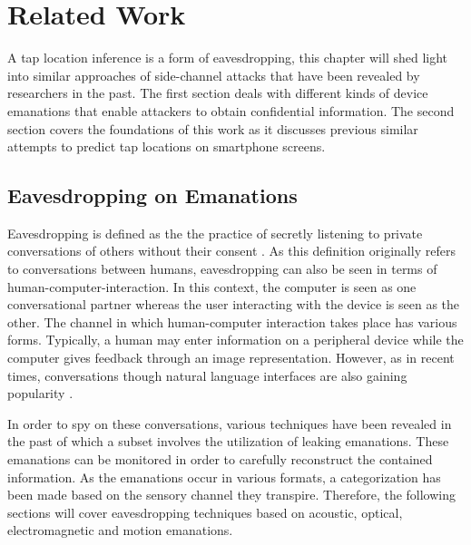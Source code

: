 \chapter{Related Work\label{cha:chapter2}}
A tap location inference is a form of eavesdropping, this chapter will shed light into similar approaches of side-channel attacks that have been revealed by researchers in the past. The first section deals with different kinds of device emanations that enable attackers to obtain confidential information. The second section covers the foundations of this work as it discusses previous similar attempts to predict tap locations on smartphone screens.

\section{Eavesdropping on Emanations}

Eavesdropping is defined as the the practice of secretly listening to private conversations of others without their consent \cite{black1990black}. As this definition originally refers to conversations between humans, eavesdropping can also be seen in terms of human-computer-interaction. In this context, the computer is seen as one conversational partner whereas the user interacting with the device is seen as the other. The channel in which human-computer interaction takes place has various forms. Typically, a human may enter information on a peripheral device while the computer gives feedback through an image representation. However, as in recent times, conversations though natural language interfaces are also gaining popularity \cite{shneiderman2016designing}.

In order to spy on these conversations, various techniques have been revealed in the past of which a subset involves the utilization of leaking emanations. These emanations can be monitored in order to carefully reconstruct the contained information. As the emanations occur in various formats, a categorization has been made based on the sensory channel they transpire. Therefore, the following sections will cover eavesdropping techniques based on acoustic, optical, electromagnetic and motion emanations.


